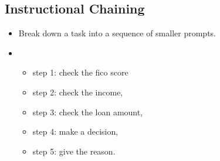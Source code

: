 \documentclass[letterpaper,11pt,english]{sphinxmanual}
\begin{document}
\subsection{Instructional Chaining}
\label{\detokenize{prompt:instructional-chaining}}\begin{itemize}
\item {} 
\sphinxAtStartPar
Break down a task into a sequence of smaller prompts.

\item {} 
\sphinxAtStartPar
{}
\begin{itemize}
\item {} 
\sphinxAtStartPar
step 1: check the fico score

\item {} 
\sphinxAtStartPar
step 2: check the income,

\item {} 
\sphinxAtStartPar
step 3: check the loan amount,

\item {} 
\sphinxAtStartPar
step 4: make a decision,

\item {} 
\sphinxAtStartPar
step 5: give the reason.

\end{itemize}

\end{itemize}
\end{document}
